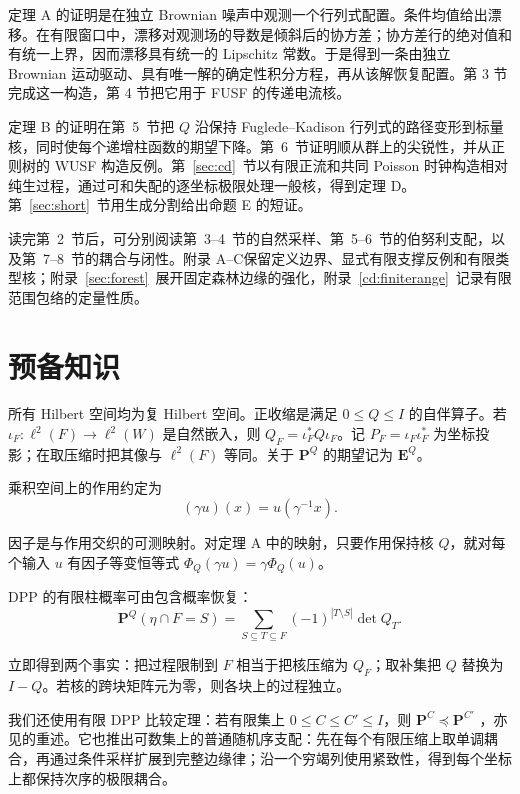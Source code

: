 \documentclass[UTF8,zihao=-4,a4paper]{ctexart}
\numberwithin{equation}{section}
\begin{document}
定理 A 的证明是在独立 Brownian 噪声中观测一个行列式配置。条件均值给出漂移。在有限窗口中，漂移对观测场的导数是倾斜后的协方差；协方差行的绝对值和有统一上界，因而漂移具有统一的 Lipschitz 常数。于是得到一条由独立 Brownian 运动驱动、具有唯一解的确定性积分方程，再从该解恢复配置。第 3 节完成这一构造，第 4 节把它用于 FUSF 的传递电流核。

定理 B 的证明在第~5~节把 $Q$ 沿保持 Fuglede--Kadison 行列式的路径变形到标量核，同时使每个递增柱函数的期望下降。第~6~节证明顺从群上的尖锐性，并从正则树的 WUSF 构造反例。第~\ref{sec:cd}~节以有限正流和共同 Poisson 时钟构造相对纯生过程，通过可和失配的逐坐标极限处理一般核，得到定理 D。第~\ref{sec:short}~节用生成分割给出命题 E 的短证。

读完第~2~节后，可分别阅读第~3--4~节的自然采样、第~5--6~节的伯努利支配，以及第~7--8~节的耦合与闭性。附录 A--C保留定义边界、显式有限支撑反例和有限类型核；附录~\ref{sec:forest}~展开固定森林边缘的强化，附录~\ref{cd:finiterange}~记录有限范围包络的定量性质。

\section{预备知识}

所有 Hilbert 空间均为复 Hilbert 空间。正收缩是满足 \(0\le Q\le I\) 的自伴算子。若
\(\iota_F:\ell^2(F)\to\ell^2(W)\) 是自然嵌入，则
\(Q_F=\iota_F^*Q\iota_F\)。记 \(P_F=\iota_F\iota_F^*\) 为坐标投影；在取压缩时把其像与 \(\ell^2(F)\) 等同。关于 \(\mathbf P^Q\) 的期望记为 \(\mathbf E^Q\)。

乘积空间上的作用约定为
\[
 (\gamma u)(x)=u(\gamma^{-1}x).
\]

因子是与作用交织的可测映射。对定理 A 中的映射，只要作用保持核 \(Q\)，就对每个输入 \(u\) 有因子等变恒等式 \(\Phi_Q(\gamma u)=\gamma\Phi_Q(u)\)。

DPP 的有限柱概率可由包含概率恢复：
\[
 \mathbf P^Q(\eta\cap F=S)
 =\sum_{S\subseteq T\subseteq F}(-1)^{|T\setminus S|}\det Q_T.
 \tag{2.1}\label{eq:2.1}
\]

立即得到两个事实：把过程限制到 \(F\) 相当于把核压缩为 \(Q_F\)；取补集把 \(Q\) 替换为 \(I-Q\)。若核的跨块矩阵元为零，则各块上的过程独立。

我们还使用有限 DPP 比较定理：若有限集上 \(0\le C\le C'\le I\)，则
\(\mathbf P^C\preceq\mathbf P^{C'}\) \cite[Theorem~4.13]{BBL}，亦见\cite[Theorem~2.1]{LT}的重述。它也推出可数集上的普通随机序支配：先在每个有限压缩上取单调耦合，再通过条件采样扩展到完整边缘律；沿一个穷竭列使用紧致性，得到每个坐标上都保持次序的极限耦合。
\end{document}
